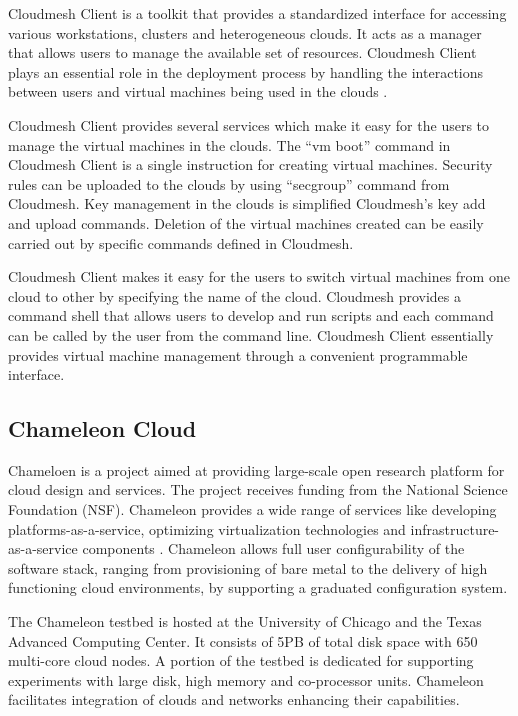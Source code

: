 \documentclass[9pt,twocolumn,twoside]{../../styles/osajnl}
\begin{document}
Cloudmesh Client is a toolkit that provides a standardized interface
for accessing various workstations, clusters and heterogeneous
clouds. It acts as a manager that allows users to manage the available
set of resources. Cloudmesh Client plays an essential role in the
deployment process by handling the interactions between users and
virtual machines being used in the clouds
\cite{cloudmeshClientdoc}.

Cloudmesh Client provides several services which make it easy for the
users to manage the virtual machines in the clouds. The “vm boot”
command in Cloudmesh Client is a single instruction for creating
virtual machines. Security rules can be uploaded to the clouds by
using “secgroup” command from Cloudmesh. Key management in the clouds
is simplified Cloudmesh’s key add and upload commands. Deletion of the
virtual machines created can be easily carried out by specific
commands defined in Cloudmesh.

Cloudmesh Client makes it easy for the users to switch virtual
machines from one cloud to other by specifying the name of the
cloud. Cloudmesh provides a command shell that allows users to develop
and run scripts and each command can be called by the user from the
command line. Cloudmesh Client essentially provides virtual machine
management through a convenient programmable interface.



\subsection{Chameleon Cloud}

Chameloen is a project aimed at providing large-scale open research
platform for cloud design and services. The project receives funding
from the National Science Foundation (NSF). Chameleon provides a wide
range of services like developing platforms-as-a-service, optimizing
virtualization technologies and infrastructure-as-a-service components
\cite{chameleonDoc}. Chameleon allows full user configurability of the
software stack, ranging from provisioning of bare metal to the
delivery of high functioning cloud environments, by supporting a
graduated configuration system.

The Chameleon testbed is hosted at the University of Chicago and the
Texas Advanced Computing Center. It consists of 5PB of total disk
space with 650 multi-core cloud nodes. A portion of the testbed is
dedicated for supporting experiments with large disk, high memory and
co-processor units. Chameleon facilitates integration of clouds and
networks enhancing their capabilities.
\end{document}
